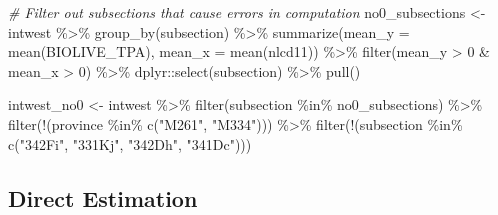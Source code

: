 \documentclass[12pt,twoside]{reedthesis}
\newenvironment{Shaded}{\begin{snugshade}}{\end{snugshade}}
\newcommand{\AttributeTok}[1]{\textcolor[rgb]{0.77,0.63,0.00}{#1}}
\newcommand{\CommentTok}[1]{\textcolor[rgb]{0.56,0.35,0.01}{\textit{#1}}}
\newcommand{\DecValTok}[1]{\textcolor[rgb]{0.00,0.00,0.81}{#1}}
\newcommand{\FunctionTok}[1]{\textcolor[rgb]{0.00,0.00,0.00}{#1}}
\newcommand{\NormalTok}[1]{#1}
\newcommand{\OtherTok}[1]{\textcolor[rgb]{0.56,0.35,0.01}{#1}}
\newcommand{\SpecialCharTok}[1]{\textcolor[rgb]{0.00,0.00,0.00}{#1}}
\newcommand{\StringTok}[1]{\textcolor[rgb]{0.31,0.60,0.02}{#1}}
\begin{document}
\begin{Shaded}
\begin{Highlighting}[]
\CommentTok{\# Filter out subsections that cause errors in computation}
\NormalTok{no0\_subsections }\OtherTok{\textless{}{-}}\NormalTok{ intwest }\SpecialCharTok{\%\textgreater{}\%}
  \FunctionTok{group\_by}\NormalTok{(subsection) }\SpecialCharTok{\%\textgreater{}\%}
  \FunctionTok{summarize}\NormalTok{(}\AttributeTok{mean\_y =} \FunctionTok{mean}\NormalTok{(BIOLIVE\_TPA),}
            \AttributeTok{mean\_x =} \FunctionTok{mean}\NormalTok{(nlcd11)) }\SpecialCharTok{\%\textgreater{}\%}
  \FunctionTok{filter}\NormalTok{(mean\_y }\SpecialCharTok{\textgreater{}} \DecValTok{0} \SpecialCharTok{\&}\NormalTok{ mean\_x }\SpecialCharTok{\textgreater{}} \DecValTok{0}\NormalTok{) }\SpecialCharTok{\%\textgreater{}\%} 
\NormalTok{  dplyr}\SpecialCharTok{::}\FunctionTok{select}\NormalTok{(subsection) }\SpecialCharTok{\%\textgreater{}\%}
  \FunctionTok{pull}\NormalTok{()}

\NormalTok{intwest\_no0 }\OtherTok{\textless{}{-}}\NormalTok{ intwest }\SpecialCharTok{\%\textgreater{}\%}
  \FunctionTok{filter}\NormalTok{(subsection }\SpecialCharTok{\%in\%}\NormalTok{ no0\_subsections) }\SpecialCharTok{\%\textgreater{}\%}
  \FunctionTok{filter}\NormalTok{(}\SpecialCharTok{!}\NormalTok{(province }\SpecialCharTok{\%in\%} \FunctionTok{c}\NormalTok{(}\StringTok{"M261"}\NormalTok{, }\StringTok{"M334"}\NormalTok{))) }\SpecialCharTok{\%\textgreater{}\%} 
  \FunctionTok{filter}\NormalTok{(}\SpecialCharTok{!}\NormalTok{(subsection }\SpecialCharTok{\%in\%} \FunctionTok{c}\NormalTok{(}\StringTok{"342Fi"}\NormalTok{, }\StringTok{"331Kj"}\NormalTok{, }\StringTok{"342Dh"}\NormalTok{, }\StringTok{"341Dc"}\NormalTok{))) }
\end{Highlighting}
\end{Shaded}
\begin{Shaded}
\end{Shaded}
\hypertarget{direct-estimation-1}{%
\subsection{Direct Estimation}\label{direct-estimation-1}}
\end{document}
